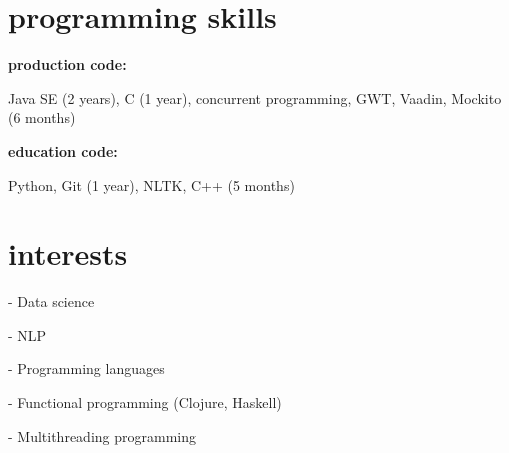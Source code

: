 \documentclass[]{friggeri-cv} %
\begin{document}
\section{programming skills}
\textbf{production code:}

Java SE (2 years), C (1 year), concurrent programming, GWT, Vaadin, Mockito (6 months)

\textbf{education code:}

Python, Git (1 year), NLTK, C++ (5 months)

\section{interests}

- Data science

- NLP

- Programming languages

- Functional programming (Clojure, Haskell)

- Multithreading programming


%
%
%
%
%
%

\end{document}
